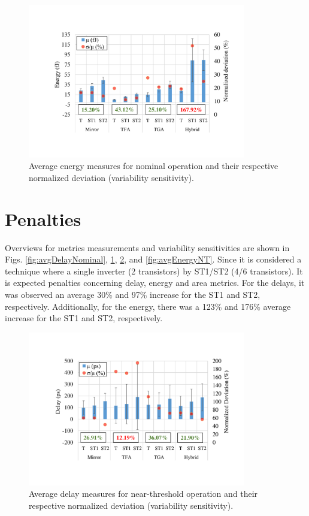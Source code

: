 \documentclass[diss,pgmicro,english]{iiufrgs}
\begin{document}
\begin{figure}[h]
  \centering
    \includegraphics[width=0.85\textwidth, trim={3.5cm 3cm 2cm 3.5cm}, clip]{averageEnergyNominal.pdf}
     \caption{Average energy measures for nominal operation and their respective normalized deviation (variability sensitivity).}
  \label{fig:avgEnergyNominal}
\end{figure}

\section{Penalties}

Overviews for metrics measurements and variability sensitivities are shown in Figs. \ref{fig:avgDelayNominal}, \ref{fig:avgEnergyNominal}, \ref{fig:avgDelayNT}, and \ref{fig:avgEnergyNT}. Since it is considered a technique where a single inverter (2 transistors) by ST1/ST2 (4/6 transistors). It is expected penalties concerning delay, energy and area metrics. For the delays, it was observed an average 30\% and 97\% increase for the ST1 and ST2, respectively. Additionally, for the energy, there was a 123\% and 176\% average increase for the ST1 and ST2, respectively.

\begin{figure}[t]
  \centering
    \includegraphics[width=0.85\textwidth, trim={3.5cm 3cm 2cm 3.5cm}, clip]{averageDelayNT.pdf}
     \caption{Average delay measures for near-threshold operation and their respective normalized deviation (variability sensitivity).}
  \label{fig:avgDelayNT}
\end{figure}
\end{document}
